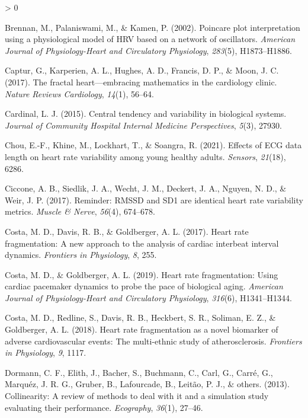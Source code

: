 \documentclass[
  english,
  jou,floatsintext]{apa6}
\newlength{\cslhangindent}
\newenvironment{CSLReferences}[2] %
 {%
  \setlength{\parindent}{0pt}
  \ifodd #1 \everypar{\setlength{\hangindent}{\cslhangindent}}\ignorespaces\fi
  \ifnum #2 > 0
  \setlength{\parskip}{#2\baselineskip}
  \fi
 }%
 {}
\begin{document}
\begin{CSLReferences}{1}{0}
\leavevmode\hypertarget{ref-brennan2002poincare}{}%
Brennan, M., Palaniswami, M., \& Kamen, P. (2002). Poincare plot interpretation using a physiological model of HRV based on a network of oscillators. \emph{American Journal of Physiology-Heart and Circulatory Physiology}, \emph{283}(5), H1873--H1886.

\leavevmode\hypertarget{ref-captur2017fractal}{}%
Captur, G., Karperien, A. L., Hughes, A. D., Francis, D. P., \& Moon, J. C. (2017). The fractal heart---embracing mathematics in the cardiology clinic. \emph{Nature Reviews Cardiology}, \emph{14}(1), 56--64.

\leavevmode\hypertarget{ref-cardinal2015central}{}%
Cardinal, L. J. (2015). Central tendency and variability in biological systems. \emph{Journal of Community Hospital Internal Medicine Perspectives}, \emph{5}(3), 27930.

\leavevmode\hypertarget{ref-chou2021effects}{}%
Chou, E.-F., Khine, M., Lockhart, T., \& Soangra, R. (2021). Effects of ECG data length on heart rate variability among young healthy adults. \emph{Sensors}, \emph{21}(18), 6286.

\leavevmode\hypertarget{ref-ciccone2017reminder}{}%
Ciccone, A. B., Siedlik, J. A., Wecht, J. M., Deckert, J. A., Nguyen, N. D., \& Weir, J. P. (2017). Reminder: RMSSD and SD1 are identical heart rate variability metrics. \emph{Muscle \& Nerve}, \emph{56}(4), 674--678.

\leavevmode\hypertarget{ref-costa2017heart}{}%
Costa, M. D., Davis, R. B., \& Goldberger, A. L. (2017). Heart rate fragmentation: A new approach to the analysis of cardiac interbeat interval dynamics. \emph{Frontiers in Physiology}, \emph{8}, 255.

\leavevmode\hypertarget{ref-costa2019heart}{}%
Costa, M. D., \& Goldberger, A. L. (2019). Heart rate fragmentation: Using cardiac pacemaker dynamics to probe the pace of biological aging. \emph{American Journal of Physiology-Heart and Circulatory Physiology}, \emph{316}(6), H1341--H1344.

\leavevmode\hypertarget{ref-costa2018heart}{}%
Costa, M. D., Redline, S., Davis, R. B., Heckbert, S. R., Soliman, E. Z., \& Goldberger, A. L. (2018). Heart rate fragmentation as a novel biomarker of adverse cardiovascular events: The multi-ethnic study of atherosclerosis. \emph{Frontiers in Physiology}, \emph{9}, 1117.

\leavevmode\hypertarget{ref-dormann2013collinearity}{}%
Dormann, C. F., Elith, J., Bacher, S., Buchmann, C., Carl, G., Carré, G., Marquéz, J. R. G., Gruber, B., Lafourcade, B., Leitão, P. J., \& others. (2013). Collinearity: A review of methods to deal with it and a simulation study evaluating their performance. \emph{Ecography}, \emph{36}(1), 27--46.


\end{CSLReferences}
\end{document}
